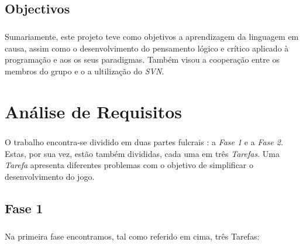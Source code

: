 \documentclass[12pt,a4paper]{report}
\begin{document}
  
  \section{Objectivos}
  \paragraph{} Sumariamente, este projeto teve como objetivos a aprendizagem da linguagem em causa, assim como o desenvolvimento do pensamento lógico e crítico aplicado à programação e aos os seus paradigmas. Também visou a cooperação entre os membros do grupo e o a ultilização do \textit{SVN}.


\chapter{Análise de Requisitos}
\paragraph{} O trabalho encontra-se dividido em duas partes fulcrais : a \textit{Fase 1} e a \textit{Fase 2}. Estas, por sua vez, estão também divididas, cada uma em três \textit{Tarefas}. 
\newline Uma \textit{Tarefa} apresenta diferentes problemas com o objetivo de simplificar o desenvolvimento do jogo.

\section{Fase 1}
\label{sec:analisefase1}
\paragraph{} Na primeira fase encontramos, tal como referido em cima, três Tarefas:
\end{document}
